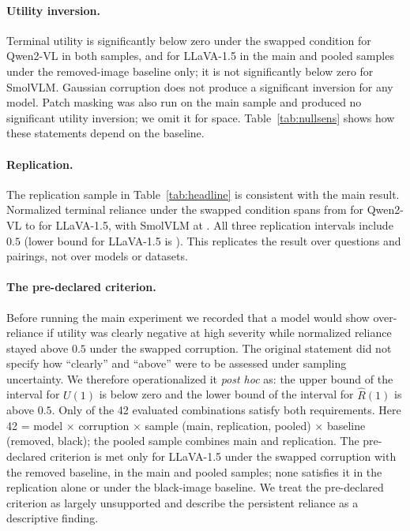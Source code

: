 \paragraph{Utility inversion.}
Terminal utility is significantly below zero under the swapped condition
for Qwen2-VL in both samples, and for LLaVA-1.5 in the main and pooled
samples under the removed-image baseline only; it is not significantly below
zero for SmolVLM. Gaussian corruption does not produce a significant
inversion for any model. Patch masking was also run on the main sample and
produced no significant utility inversion; we omit it for space.
Table~\ref{tab:nullsens} shows how these statements depend on the baseline.

\paragraph{Replication.}
The replication sample in Table~\ref{tab:headline} is consistent with the main result.
Normalized terminal reliance under the swapped condition spans from
 for Qwen2-VL to
 for LLaVA-1.5, with SmolVLM at
. All three replication
intervals include $0.5$ (lower bound for LLaVA-1.5 is
).
This replicates the result over questions and pairings, not over models or
datasets.

\paragraph{The pre-declared criterion.}
Before running the main experiment we recorded that a model would show
over-reliance if utility was clearly negative at high severity while
normalized reliance stayed above $0.5$ under the swapped corruption. The
original statement did not specify how ``clearly'' and ``above'' were to
be assessed under sampling uncertainty. We therefore operationalized it
\emph{post hoc} as: the upper bound of the interval for $U(1)$ is below
zero and the lower bound of the interval for $\hat R(1)$ is above $0.5$.
Only  of the 42
evaluated combinations satisfy both requirements. Here 42 = model $\times$ corruption $\times$ sample (main, replication, pooled) $\times$ baseline (removed, black); the pooled sample combines main and replication.
The pre-declared criterion is met only for LLaVA-1.5 under the swapped
corruption with the removed baseline, in the main and pooled samples;
none satisfies it in the replication alone or under the black-image baseline.
We treat the pre-declared criterion as largely unsupported and describe
the persistent reliance as a descriptive finding.

